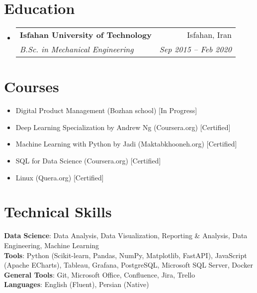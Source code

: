 \documentclass[11pt, a4paper]{article}
\makeatletter
\newcommand{\resumeItem}[1]{\item\small{#1 \vspace{-2pt}}}
\newcommand{\resumeSubheading}[4]{
    \vspace{-2pt}\item
    \begin{tabular*}{0.97\textwidth}[t]{l@{\extracolsep{\fill}}r}
        \textbf{#1} & #2 \\
        \textit{\small#3} & \textit{\small #4} \\
    \end{tabular*}\vspace{-7pt}
}
\newcommand{\resumeSubHeadingListStart}{\begin{itemize}[leftmargin=0.15in, label={}]}
\newcommand{\resumeSubHeadingListEnd}{\end{itemize}}
\makeatother
\begin{document}
\section{Education}
\resumeSubHeadingListStart
    \resumeSubheading
        {Isfahan University of Technology}{Isfahan, Iran}
        {B.Sc. in Mechanical Engineering}{Sep 2015 -- Feb 2020}
\resumeSubHeadingListEnd

\section{Courses}
\resumeSubHeadingListStart
    \resumeItem{Digital Product Management (Bozhan school) [In Progress]}
    \resumeItem{Deep Learning Specialization by Andrew Ng (Coursera.org) [Certified]}
    \resumeItem{Machine Learning with Python by Jadi (Maktabkhooneh.org) [Certified]}
    \resumeItem{SQL for Data Science (Coursera.org) [Certified]}
    \resumeItem{Linux (Quera.org) [Certified]}
\resumeSubHeadingListEnd

\section{Technical Skills}
\begin{itemize}[leftmargin=0.15in, label={}]
    \small{\item{
        \textbf{Data Science}{: Data Analysis, Data Visualization, Reporting \& Analysis, Data Engineering, Machine Learning} \\
        \textbf{Tools}{: Python (Scikit-learn, Pandas, NumPy, Matplotlib, FastAPI), JavaScript (Apache ECharts), Tableau, Grafana, PostgreSQL, Microsoft SQL Server, Docker} \\
        \textbf{General Tools}{: Git, Microsoft Office, Confluence, Jira, Trello} \\
        \textbf{Languages}{: English (Fluent), Persian (Native)}
    }}
\end{itemize}
\end{document}
